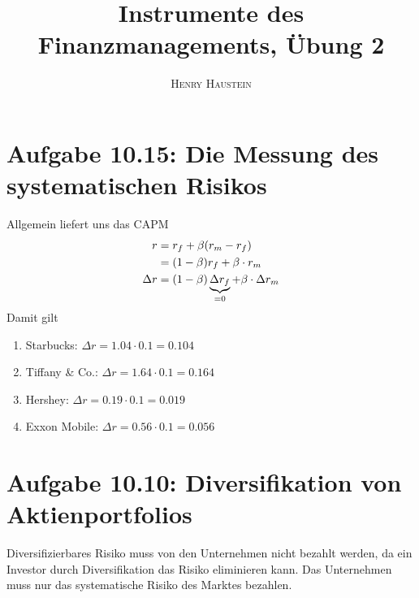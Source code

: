 \documentclass{article}
\title{\textbf{Instrumente des Finanzmanagements, Übung 2}}
\author{\textsc{Henry Haustein}}
\date{}
\begin{document}
	\maketitle

	\section*{Aufgabe 10.15: Die Messung des systematischen Risikos}
	Allgemein liefert uns das CAPM
	\begin{align}
		r &= r_f + \beta(r_m-r_f) \notag \\
		&= (1-\beta)r_f + \beta\cdot r_m \notag \\
		\Delta r &= (1-\beta)\underbrace{\Delta r_f}_{=0} + \beta\cdot\Delta r_m \notag
	\end{align}
	Damit gilt
	\begin{enumerate}[label=(\alph*)]
		\item Starbucks: $\Delta r = 1.04\cdot 0.1 = 0.104$
		\item Tiffany \& Co.: $\Delta r = 1.64\cdot 0.1 = 0.164$
		\item Hershey: $\Delta r = 0.19\cdot 0.1 = 0.019$
		\item Exxon Mobile: $\Delta r = 0.56\cdot 0.1 = 0.056$
	\end{enumerate}
	
	\section*{Aufgabe 10.10: Diversifikation von Aktienportfolios}
	Diversifizierbares Risiko muss von den Unternehmen nicht bezahlt werden, da ein Investor durch Diversifikation das Risiko eliminieren kann. Das Unternehmen muss nur das systematische Risiko des Marktes bezahlen.
	
\end{document}

